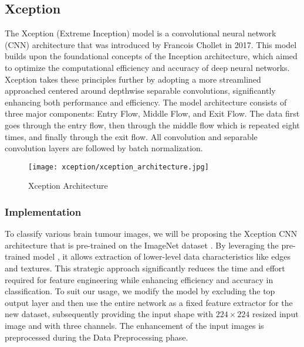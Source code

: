 \subsection{Xception}\label{s:xception}


The Xception (Extreme Inception) model is a convolutional neural network (CNN) architecture that was introduced by Francois Chollet \cite{Francois_Chollet_2017} in 2017. This model builds upon the foundational concepts of the Inception architecture, which aimed to optimize the computational efficiency and accuracy of deep neural networks. Xception takes these principles further by adopting a more streamlined approached centered around depthwise separable convolutions, significantly enhancing both performance and efficiency. The model architecture consists of three major components: Entry Flow, Middle Flow, and Exit Flow. The data first goes through the entry flow, then through the middle flow which is repeated eight times, and finally through the exit flow. All convolution and separable convolution layers are followed by batch normalization.

\begin{figure}[H]
  \begin{center}
    \texttt{[image: xception/xception\_architecture.jpg]}
  \end{center}
  \caption{Xception Architecture}\label{f:xception_architecture}
\end{figure}

\subsubsection{Implementation}

To classify various brain tumour images, we will be proposing the Xception CNN architecture that is pre-trained on the ImageNet dataset \cite{Deng_ImageNet_2009}. By leveraging the pre-trained model \cite{Kenan_Morani_2023}, it allows extraction of lower-level data characteristics like edges and textures. This strategic approach significantly reduces the time and effort required for feature engineering while enhancing efficiency and accuracy in classification. To suit our usage, we modify the model by excluding the top output layer and then use the entire network as a fixed feature extractor for the new dataset, subsequently providing the input shape with $224\times224$ resized input image and with three channels. The enhancement of the input images is preprocessed during the Data Preprocessing phase.

